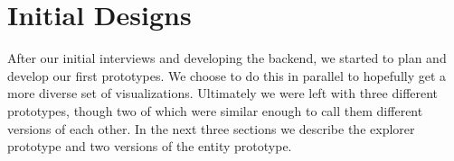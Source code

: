 \section{Initial Designs}
 
After our initial interviews and developing the backend, we started to plan and develop our first prototypes. 
We choose to do this in parallel to hopefully get a more diverse set of visualizations. Ultimately we were 
left with three different prototypes, though two of which were similar enough to call them different versions 
of each other. In the next three sections we describe the explorer prototype and two versions of the entity
prototype. 



